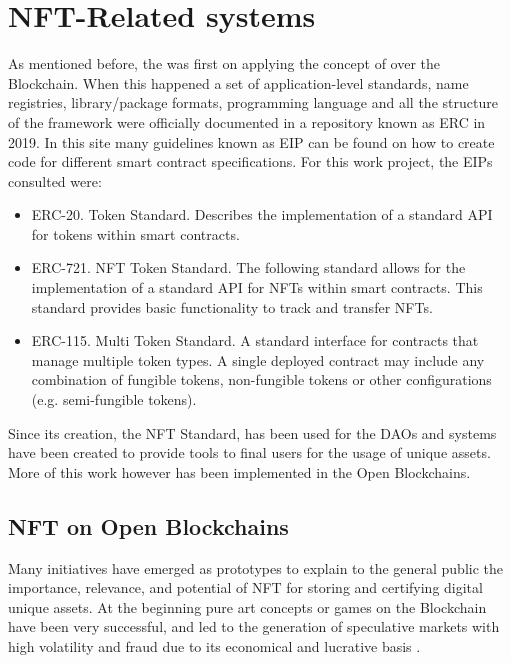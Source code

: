 \section{NFT-Related systems}
As mentioned before, the  was first on applying the concept of  over the Blockchain. When this happened a set of application-level standards, name registries, library/package formats, programming language and all the structure of the framework were officially documented in a repository known as \ac{ERC} in 2019. In this site many guidelines known as \ac{EIP} can be found on how to create code for different smart contract specifications. For this work project, the \ac{EIP}s consulted were:
\begin{itemize}
    \item ERC-20. Token Standard. Describes the implementation of a standard API for tokens within smart contracts.\cite{EIP20Tok46:online}
    \item ERC-721. \ac{NFT} Token Standard. The following standard allows for the implementation of a standard API for NFTs within smart contracts. This standard provides basic functionality to track and transfer \ac{NFT}s\cite{EIP721No36:online}.
    \item ERC-115. Multi Token Standard. A standard interface for contracts that manage multiple token types. A single deployed contract may include any combination of fungible tokens, non-fungible tokens or other configurations (e.g. semi-fungible tokens)\cite{EIP1155M92:online}.
\end{itemize}

Since its creation, the \ac{NFT} Standard, has been used for the \ac{DAO}s and systems have been created to provide tools to final users for the usage of unique assets. More of this work however has been implemented in the Open Blockchains.

\subsection{NFT on Open Blockchains}
Many initiatives have emerged as prototypes to explain to the general public the importance, relevance, and potential of NFT for storing and certifying digital unique assets. At the beginning pure art concepts or games on the  Blockchain have been very successful, and led to the generation of speculative markets with high volatility and fraud due to its economical and lucrative basis \cite{TheHisto62:online}.


